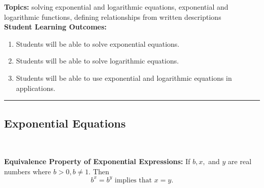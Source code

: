 

\noindent \textbf{Topics:}  solving exponential and logarithmic equations, exponential and logarithmic functions, defining relationships from written descriptions\\

\noindent \textbf{Student Learning Outcomes:}
\begin{enumerate}
\item Students will be able to solve exponential equations.
\item Students will be able to solve logarithmic equations.
\item Students will be able to use exponential and logarithmic equations in applications.
\end{enumerate}

\hrule 

\bigskip

\subsection{Exponential Equations} ~


\noindent \textbf{Equivalence Property of Exponential Expressions:} If $b, x,$ and $y$ are real numbers where $b>0, b \neq 1.$  Then $$b^x=b^y \text{ implies that } x=y.$$   



